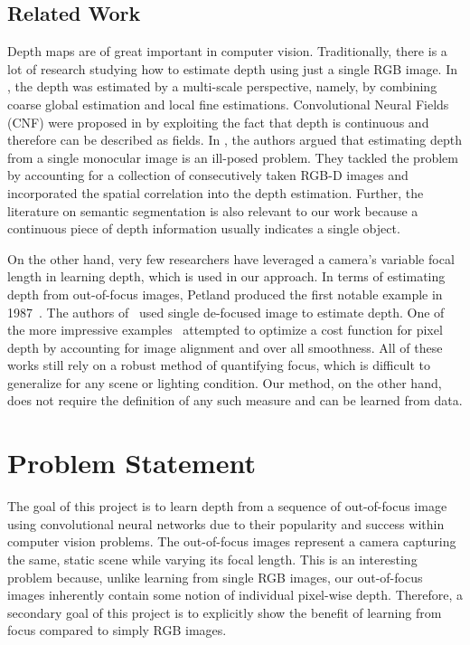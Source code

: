 \documentclass[letterpaper, 10 pt, conference]{ieeeconf}  %
\begin{document}
\subsection{Related Work}
Depth maps are of great important in computer vision. Traditionally, there is a lot of research studying how to estimate depth using just a single RGB image. In \cite{eigen2014depth}, the depth was estimated by a multi-scale perspective, namely, by combining coarse global estimation and local fine estimations. Convolutional Neural Fields (CNF) were proposed in \cite{liu2015learning} by exploiting the fact that depth is continuous and therefore can be described as fields. In \cite{choi2015depth}, the authors argued that estimating depth from a single monocular image is an ill-posed problem. They tackled the problem by accounting for a collection of consecutively taken RGB-D images and incorporated the spatial correlation into the depth estimation. Further, the literature on semantic segmentation \cite{long2015fully} is also relevant to our work because a continuous piece of depth information usually indicates a single object. 

On the other hand, very few researchers have leveraged a camera's variable focal length in learning depth, which is used in our approach. In terms of estimating depth from out-of-focus images, Petland produced the first notable example in 1987~\cite{pentland1987new}. The authors of~\cite{lin2013absolute} used single de-focused image to estimate depth. One of the more impressive examples~\cite{suwajanakorn2015depth} attempted to optimize a cost function for pixel depth by accounting for image alignment and over all smoothness. All of these works still rely on a robust method of quantifying focus, which is difficult to generalize for any scene or lighting condition. Our method, on the other hand, does not require the definition of any such measure and can be learned from data. 

\section{Problem Statement}
\label{sec:problemStatement}

The goal of this project is to learn depth from a sequence of out-of-focus image using convolutional neural networks due to their popularity and success within computer vision problems. The out-of-focus images represent a camera capturing the same, static scene while varying its focal length. This is an interesting problem because, unlike learning from single RGB images, our out-of-focus images inherently contain some notion of individual pixel-wise depth. Therefore, a secondary goal of this project is to explicitly show the benefit of learning from focus compared to simply RGB images. 
\end{document}
